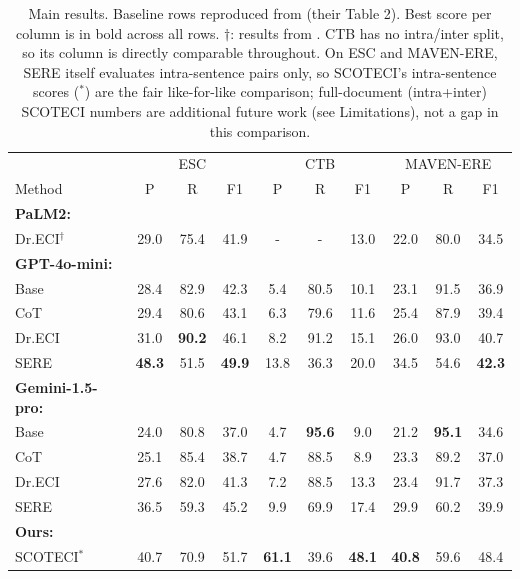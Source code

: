 \documentclass[11pt]{article}
\begin{document}
\begin{table}
\begin{tabular}{l ccc|ccc|ccc}
\toprule
 & \multicolumn{3}{c|}{ESC} & \multicolumn{3}{c|}{CTB} & \multicolumn{3}{c}{MAVEN-ERE} \\
Method & P & R & F1 & P & R & F1 & P & R & F1 \\
\midrule
\textbf{PaLM2:} & & & & & & & & & \\
\quad Dr.ECI$^\dagger$ & 29.0 & 75.4 & 41.9 & - & - & 13.0 & 22.0 & 80.0 & 34.5 \\
\midrule
\textbf{GPT-4o-mini:} & & & & & & & & & \\
\quad Base          & 28.4 & 82.9 & 42.3 & 5.4  & 80.5 & 10.1 & 23.1 & 91.5 & 36.9 \\
\quad CoT           & 29.4 & 80.6 & 43.1 & 6.3  & 79.6 & 11.6 & 25.4 & 87.9 & 39.4 \\
\quad Dr.ECI        & 31.0 & \textbf{90.2} & 46.1 & 8.2  & 91.2 & 15.1 & 26.0 & 93.0 & 40.7 \\
\quad SERE          & \textbf{48.3} & 51.5 & \textbf{49.9} & 13.8 & 36.3 & 20.0 & 34.5 & 54.6 & \textbf{42.3} \\
\midrule
\textbf{Gemini-1.5-pro:} & & & & & & & & & \\
\quad Base          & 24.0 & 80.8 & 37.0 & 4.7  & \textbf{95.6} & 9.0  & 21.2 & \textbf{95.1} & 34.6 \\
\quad CoT           & 25.1 & 85.4 & 38.7 & 4.7  & 88.5 & 8.9  & 23.3 & 89.2 & 37.0 \\
\quad Dr.ECI        & 27.6 & 82.0 & 41.3 & 7.2  & 88.5 & 13.3 & 23.4 & 91.7 & 37.3 \\
\quad SERE          & 36.5 & 59.3 & 45.2 & 9.9  & 69.9 & 17.4 & 29.9 & 60.2 & 39.9 \\
\midrule
\textbf{Ours:} & & & & & & & & & \\
\quad SCOTECI$^*$   & 40.7 & 70.9 & 51.7 & \textbf{61.1} & 39.6 & \textbf{48.1} & \textbf{40.8} & 59.6 & 48.4 \\
\bottomrule
\end{tabular}
\centering
\small
\caption{Main results. Baseline rows reproduced from \citet{hao2026sere} (their Table 2). Best score per column is in bold across all rows. $\dagger$: results from \citet{cai2025dreci}. CTB has no intra/inter split, so its column is directly comparable throughout. On ESC and MAVEN-ERE, SERE itself evaluates intra-sentence pairs only, so SCOTECI's intra-sentence scores ($^*$) are the fair like-for-like comparison; full-document (intra+inter) SCOTECI numbers are additional future work (see Limitations), not a gap in this comparison.}
\label{tab:main-results}
\end{table}
\end{document}
